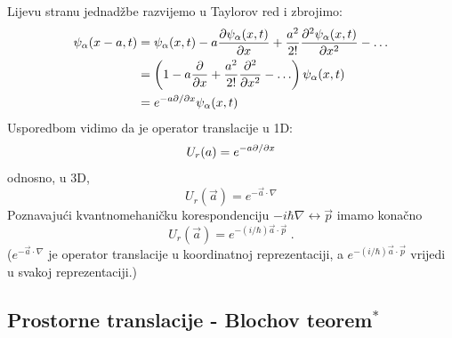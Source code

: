 Lijevu stranu jednadžbe razvijemo u Taylorov red i zbrojimo:
\begin{equation*}
\begin{split}
 \psi_{\alpha}(x-a,t)&=\psi_{\alpha}(x,t)-a\frac{\partial\psi_{\alpha}(x,t)}
{\partial x}+\frac{a^2}{2!}\frac{\partial^2 \psi_{\alpha}(x,t)}{\partial x^2}-\ldots \\
&=\left(1-a\frac{\partial}{\partial x}+\frac{a^2}{2!}\frac{\partial^2}{\partial x^2} - \ldots\right)
\psi_{\alpha}(x,t) \\
&=e^{-a \partial / \partial  x} \psi_{\alpha}(x,t)
\end{split}
\end{equation*}
Usporedbom vidimo da je operator translacije u 1D:
\begin{displaymath}
U_r(a)= e^{-a \partial / \partial  x}
\end{displaymath}
odnosno, u 3D,
\begin{displaymath}
U_r(\vec{a})= e^{-\vec{a}\cdot\nabla}
\end{displaymath}
Poznavajući kvantnomehaničku korespondenciju $-i\hbar\nabla \leftrightarrow
\vec{p}$ imamo konačno
\begin{equation}
U_r(\vec{a})= e^{-(i/\hbar)\vec{a}\cdot\vec{p}} \;.
\end{equation}
($e^{-\vec{a}\cdot\nabla}$ je operator translacije u koordinatnoj
reprezentaciji, a $e^{-(i/\hbar)\vec{a}\cdot\vec{p}}$ vrijedi u svakoj 
reprezentaciji.)

% 
 
\subsection{Prostorne translacije - Blochov teorem$^*$}

